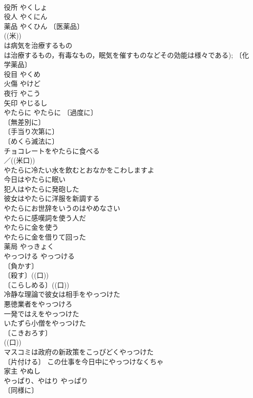\documentclass[8pt]{extreport}
\begin{document}
\begin{CJK}{UTF8}{min}
\\	役所	やくしょ	
\\	役人	やくにん	
\\	薬品	やくひん	〔医薬品〕
\\	((米)) 
\\	は病気を治療するもの
\\	は治療するもの，有毒なもの，眠気を催すものなどその効能は様々である); 〔化学薬品〕
\\	役目	やくめ	
\\	火傷	やけど	
\\	夜行	やこう	
\\	矢印	やじるし	
\\	やたらに	やたらに	〔過度に〕
\\	〔無差別に〕
\\	〔手当り次第に〕
\\	〔めくら滅法に〕
\\	チョコレートをやたらに食べる 
\\	／((米口)) 
\\	やたらに冷たい水を飲むとおなかをこわしますよ 
\\	今日はやたらに眠い 
\\	犯人はやたらに発砲した 
\\	彼女はやたらに洋服を新調する 
\\	やたらにお世辞をいうのはやめなさい 
\\	やたらに感嘆詞を使う人だ 
\\	やたらに金を使う 
\\	やたらに金を借りて回った 
\\	薬局	やっきょく	
\\	やっつける	やっつける	
\\	〔負かす〕
\\	〔殺す〕((口)) 
\\	〔こらしめる〕((口)) 
\\	冷静な理論で彼女は相手をやっつけた 
\\	悪徳業者をやっつけろ 
\\	一発ではえをやっつけた 
\\	いたずら小僧をやっつけた 
\\	〔こきおろす〕
\\	((口)) 
\\	マスコミは政府の新政策をこっぴどくやっつけた 
\\	〔片付ける〕 この仕事を今日中にやっつけなくちゃ 
\\	家主	やぬし	
\\	やっぱり、やはり	やっぱり	
\\	〔同様に〕

\end{CJK}
\end{document}
